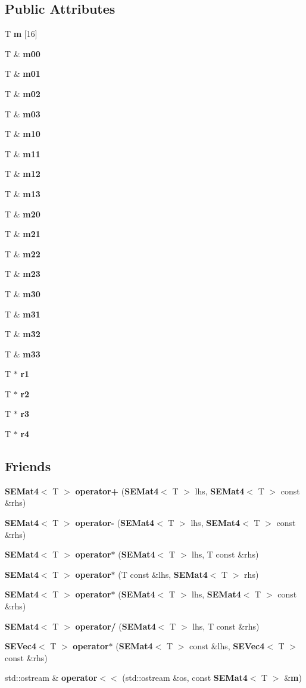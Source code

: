 \subsection*{Public Attributes}
\begin{DoxyCompactItemize}
\item 
T {\bf m} [16]
\item 
T \& {\bf m00}
\item 
T \& {\bf m01}
\item 
T \& {\bf m02}
\item 
T \& {\bf m03}
\item 
T \& {\bf m10}
\item 
T \& {\bf m11}
\item 
T \& {\bf m12}
\item 
T \& {\bf m13}
\item 
T \& {\bf m20}
\item 
T \& {\bf m21}
\item 
T \& {\bf m22}
\item 
T \& {\bf m23}
\item 
T \& {\bf m30}
\item 
T \& {\bf m31}
\item 
T \& {\bf m32}
\item 
T \& {\bf m33}
\item 
T $\ast$ {\bf r1}
\item 
T $\ast$ {\bf r2}
\item 
T $\ast$ {\bf r3}
\item 
T $\ast$ {\bf r4}
\end{DoxyCompactItemize}
\subsection*{Friends}
\begin{DoxyCompactItemize}
\item 
{\bf S\+E\+Mat4}$<$ T $>$ {\bf operator+} ({\bf S\+E\+Mat4}$<$ T $>$ lhs, {\bf S\+E\+Mat4}$<$ T $>$ const \&rhs)
\item 
{\bf S\+E\+Mat4}$<$ T $>$ {\bf operator-\/} ({\bf S\+E\+Mat4}$<$ T $>$ lhs, {\bf S\+E\+Mat4}$<$ T $>$ const \&rhs)
\item 
{\bf S\+E\+Mat4}$<$ T $>$ {\bf operator$\ast$} ({\bf S\+E\+Mat4}$<$ T $>$ lhs, T const \&rhs)
\item 
{\bf S\+E\+Mat4}$<$ T $>$ {\bf operator$\ast$} (T const \&lhs, {\bf S\+E\+Mat4}$<$ T $>$ rhs)
\item 
{\bf S\+E\+Mat4}$<$ T $>$ {\bf operator$\ast$} ({\bf S\+E\+Mat4}$<$ T $>$ lhs, {\bf S\+E\+Mat4}$<$ T $>$ const \&rhs)
\item 
{\bf S\+E\+Mat4}$<$ T $>$ {\bf operator/} ({\bf S\+E\+Mat4}$<$ T $>$ lhs, T const \&rhs)
\item 
{\bf S\+E\+Vec4}$<$ T $>$ {\bf operator$\ast$} ({\bf S\+E\+Mat4}$<$ T $>$ const \&lhs, {\bf S\+E\+Vec4}$<$ T $>$ const \&rhs)
\item 
std\+::ostream \& {\bf operator$<$$<$} (std\+::ostream \&os, const {\bf S\+E\+Mat4}$<$ T $>$ \&{\bf m})
\end{DoxyCompactItemize}


